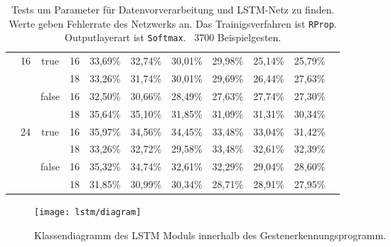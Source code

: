 \begin{sidewaystable}[h]
\begin{tabular}{|c|c|c|c|c|c|c|c|c|c|c|}
  &\multirow{4}{*}{16}&\multirow{2}{*}{true}&16&33,69\%&32,74\%&30,01\%&29,98\%&25,14\%&25,79\%&\\\cline{4-10}
  & & &18&33,26\%&31,74\%&30,01\%&29,69\%&26,44\%&27,63\%&\\\cline{3-10}
  & &\multirow{2}{*}{false}&16&32,50\%&30,66\%&28,49\%&27,63\%&27,74\%&27,30\%&\\\cline{4-10}
  & & &18&35,64\%&35,10\%&31,85\%&31,09\%&31,31\%&30,34\%&\\\cline{2-10}
  
  &\multirow{4}{*}{24}&\multirow{2}{*}{true}&16&35,97\%&34,56\%&34,45\%&33,48\%&33,04\%&31,42\%&\\\cline{4-10}
  & & &18&33,26\%&32,72\%&29,58\%&33,48\%&32,61\%&32,39\%&\\\cline{3-10}
  & &\multirow{2}{*}{false}&16&35,32\%&34,74\%&32,61\%&32,29\%&29,04\%&28,60\%&\\\cline{4-10}
  & & &18&31,85\%&30,99\%&30,34\%&28,71\%&28,91\%&27,95\%&\\
\hline
\end{tabular} 
\caption[Tests für Daten und LSTM-Netz]{Tests um Parameter für Datenvorverarbeitung und LSTM-Netz zu finden. Werte geben Fehlerrate des Netzwerks an. Das Trainigsverfahren ist \texttt{RProp}. Outputlayerart ist \texttt{Softmax}. ~3700 Beispielgesten.}
\label{tab:inputtests}
\end{sidewaystable}

\begin{figure}[h]
  \begin{center}
  \texttt{[image: lstm/diagram]}
  \caption[\acs{LSTM} Klassendiagramm]{Klassendiagramm des \acs{LSTM} Moduls innerhalb des Gestenerkennungsprogramm. }
  \label{fig:lstm_class}
  \end{center}
\end{figure}  